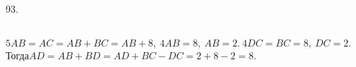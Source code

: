 93. \begin{figure}[ht!]
\end{figure}\\
$5AB=AC=AB+BC=AB+8,\ 4AB=8,\ AB=2.\ 4DC=BC=8,\ DC=2.$ Тогда$AD=AB+BD=AD+BC-DC=2+8-2=8.$\\
